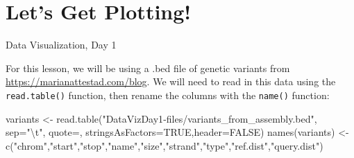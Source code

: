\documentclass[
  letterpaper,
  DIV=11,
  numbers=noendperiod]{scrreprt}
\newenvironment{Shaded}{\begin{snugshade}}{\end{snugshade}}
\newcommand{\AttributeTok}[1]{\textcolor[rgb]{0.40,0.45,0.13}{#1}}
\newcommand{\CommentTok}[1]{\textcolor[rgb]{0.37,0.37,0.37}{#1}}
\newcommand{\ConstantTok}[1]{\textcolor[rgb]{0.56,0.35,0.01}{#1}}
\newcommand{\FunctionTok}[1]{\textcolor[rgb]{0.28,0.35,0.67}{#1}}
\newcommand{\NormalTok}[1]{\textcolor[rgb]{0.00,0.23,0.31}{#1}}
\newcommand{\OtherTok}[1]{\textcolor[rgb]{0.00,0.23,0.31}{#1}}
\newcommand{\SpecialCharTok}[1]{\textcolor[rgb]{0.37,0.37,0.37}{#1}}
\newcommand{\StringTok}[1]{\textcolor[rgb]{0.13,0.47,0.30}{#1}}
\begin{document}
\begin{Shaded}
\end{Shaded}


\hypertarget{lets-get-plotting}{%
\chapter{Let's Get Plotting!}\label{lets-get-plotting}}

Data Visualization, Day 1

\hfill\break

For this lesson, we will be using a .bed file of genetic variants from
\url{https://marianattestad.com/blog}. We will need to read in this data
using the \texttt{read.table()} function, then rename the columns with
the \texttt{name()} function:

\begin{Shaded}
\begin{Highlighting}[]
\NormalTok{variants }\OtherTok{\textless{}{-}} \FunctionTok{read.table}\NormalTok{(}\StringTok{"DataVizDay1{-}files/variants\_from\_assembly.bed"}\NormalTok{, }\AttributeTok{sep=}\StringTok{"}\SpecialCharTok{\textbackslash{}t}\StringTok{"}\NormalTok{, }\AttributeTok{quote=}\StringTok{\textquotesingle{}\textquotesingle{}}\NormalTok{, }\AttributeTok{stringsAsFactors=}\ConstantTok{TRUE}\NormalTok{,}\AttributeTok{header=}\ConstantTok{FALSE}\NormalTok{)}
\FunctionTok{names}\NormalTok{(variants) }\OtherTok{\textless{}{-}} \FunctionTok{c}\NormalTok{(}\StringTok{"chrom"}\NormalTok{,}\StringTok{"start"}\NormalTok{,}\StringTok{"stop"}\NormalTok{,}\StringTok{"name"}\NormalTok{,}\StringTok{"size"}\NormalTok{,}\StringTok{"strand"}\NormalTok{,}\StringTok{"type"}\NormalTok{,}\StringTok{"ref.dist"}\NormalTok{,}\StringTok{"query.dist"}\NormalTok{)}
\end{Highlighting}
\end{Shaded}
\end{document}
